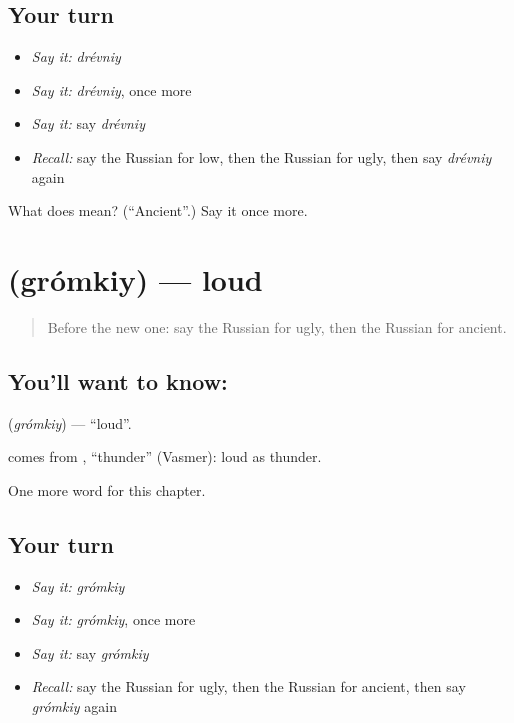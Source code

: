 \subsection*{Your turn}
\begin{itemize}
\raggedright
  \item \emph{Say it:} \emph{drévniy}
  \item \emph{Say it:} \emph{drévniy}, once more
  \item \emph{Say it:} say \emph{drévniy}
  \item \emph{Recall:} say the Russian for low, then the Russian for ugly, then say \emph{drévniy} again
\end{itemize}

\begin{tcolorbox}[breakable,colback=teal!4,colframe=teal!35!black,title={Before you move on}]
What does  mean? (\textquotedblleft{}Ancient\textquotedblright{}.) Say it once more.
\end{tcolorbox}
\section[\texorpdfstring{\ru{громкий} (grómkiy)}{громкий (grómkiy)}]{ (grómkiy) — loud}

\label{lesson:RU-C244-gromkiy}



\begin{quote}
Before the new one: say the Russian for ugly, then the Russian for ancient.
\end{quote}

\subsection*{You'll want to know: }
\textbf{} (\emph{grómkiy}) — \textquotedblleft{}loud\textquotedblright{}.

\begin{cousinweb}
\textbf{} comes from \emph{}, \textquotedblleft{}thunder\textquotedblright{} (Vasmer): loud as thunder.
\end{cousinweb}

\begin{grammarlens}[title={What you've built}]
One more word for this chapter.
\end{grammarlens}

\subsection*{Your turn}
\begin{itemize}
\raggedright
  \item \emph{Say it:} \emph{grómkiy}
  \item \emph{Say it:} \emph{grómkiy}, once more
  \item \emph{Say it:} say \emph{grómkiy}
  \item \emph{Recall:} say the Russian for ugly, then the Russian for ancient, then say \emph{grómkiy} again
\end{itemize}

